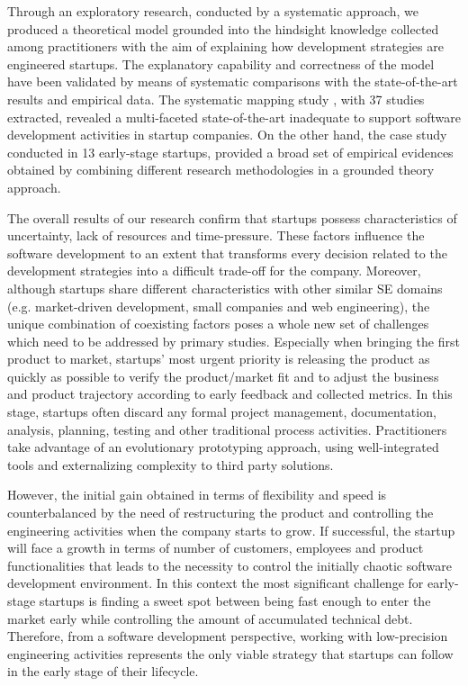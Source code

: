 \documentclass[10pt,journal,letterpaper,compsoc]{IEEEtran}
\begin{document}
Through an exploratory research, conducted by a systematic approach, we 
produced a theoretical model grounded into the hindsight knowledge collected 
among practitioners with the aim of explaining how development strategies are 
engineered startups. The explanatory capability and correctness of the model 
have been validated by means of systematic comparisons with the state-of-the-art 
results and empirical data. The systematic mapping study \cite{SMS}, 
with 37 studies extracted, revealed a 
multi-faceted state-of-the-art inadequate to support software development 
activities in startup companies. %
On the other hand, the case study conducted in 13 early-stage startups, 
provided a broad set of empirical evidences obtained by combining different 
research methodologies in a grounded theory approach.

The overall results of our research confirm that startups possess %
characteristics of uncertainty, lack of resources and time-pressure. These 
factors influence the software development to an extent that transforms every 
decision related to the development strategies into a difficult trade-off for 
the company. Moreover, although startups share different characteristics with 
other similar SE domains (e.g. market-driven development, small companies and 
web engineering), the unique combination of coexisting factors poses a whole new 
set of challenges which need to be addressed by primary studies. Especially when 
bringing the first product to market, startups' most urgent priority is 
releasing the product as quickly as possible to verify the product/market fit 
and to adjust the business and product trajectory according to early feedback 
and collected metrics. In this stage, startups often discard any formal project 
management, documentation, analysis, planning, testing and other traditional 
process activities. Practitioners take advantage of an evolutionary prototyping 
approach, using well-integrated tools and externalizing complexity to third 
party solutions.

However, the initial gain obtained in terms of flexibility and speed is 
counterbalanced by the need of restructuring the product and controlling the 
engineering activities when the company starts to grow. If successful, the 
startup will face a growth in terms of number of customers, employees and 
product functionalities that leads to the necessity to control the initially 
chaotic software development environment. In this context the most significant 
challenge for early-stage startups is finding a sweet spot between being fast 
enough to enter the market early while controlling the amount of accumulated 
technical debt.  %
Therefore, from a software development perspective, working with low-precision 
engineering activities represents the only viable strategy that startups can 
follow in the early stage of their lifecycle.
\end{document}
